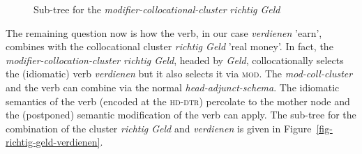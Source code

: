 \documentclass[11pt,a4paper,fleqn]{article}
\begin{document}
\begin{figure}[htbp]
\caption{\label{fig-richtig-geld}Sub-tree for the \textit{modifier-collocational-cluster} \textit{richtig Geld}}
\end{figure}


The remaining question now is how the verb, in our case \textit{verdienen} 'earn',  combines with the collocational cluster 
\textit{richtig Geld} 'real money'. In fact,  the \textit{modifier-collocation-cluster} \textit{richtig Geld}, headed by \textit{Geld}, collocationally
 selects the (idiomatic) verb \textit{verdienen} but it also selects it via \textsc{mod}. The \textit{mod-coll-cluster} and the verb 
can combine via the normal \textit{head-adjunct-schema}. The idiomatic semantics of the verb (encoded at the \textsc{hd-dtr}) percolate to the mother node
and the (postponed) semantic modification of the verb can apply. The sub-tree for the combination of the cluster \textit{richtig Geld} 
and \textit{verdienen} is given in Figure~\vref{fig-richtig-geld-verdienen}.
\newcommand{\AvmSix}{
 \begin{Avm}{\textit{mod-coll-Cl}}
    \[ \tp{mod-coll-cluster} \cr
       phon    &  \< \tp{richtig geld} \> \cr
       ss\|loc\|cat\|head   & \[ mod & V \[lid \@{4}\] \cr
                                 lid & Geld-idiomatic 
                              \] \cr
       cont    &  \[ index & non-referential
                  \] \cr
      coll\|lid   & \@{4} verdienen-idiomatic                                                 
  \]
\end{Avm}
}
\newcommand{\AvmSeven}{
  \begin{avm}
    \[ \tp{phrase} \cr
       phon    &  \< \tp{richtig geld verdienen}\> \cr
       ss\|loc &  \[ cat & \[
                              head   & \[ lid & verdienen-idio \] \cr 
			      subcat & \< np-\tp{nom} \@{5} \>
                           \]
                   \] \cr
       cont    &  \[ rels \< \[ \tp{make heaps}\cr
                               agent & \@{5} 
                             \]   
                          \>
                  \] \cr
      coll     &  \<\>                                                
  \]
\end{avm}
}
\newcommand{\AvmEight}{
 \begin{Avm}{V}
  \[ \tp{word} \cr\
     phon    & \< \tp{verdienen}\> \cr
     ss\|loc & \[ cat & \[
                          head & \[ lid & verdienen-idiomatic\] \cr
                          subcat & \< np-\tp{nom} \@{5} \>
                       \]
               \] \cr 
    cont      & \[ rels \< \[\tp{make heaps}\cr
                              agent & \@{5} 
                            \]
                         \>            
                \] \cr
    coll\|lid & Geld-idiomatic
   \]
\end{Avm}
}
\end{document}
